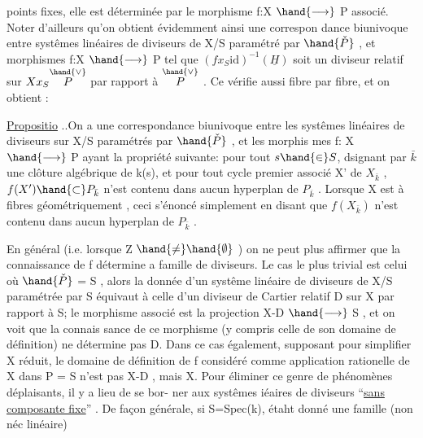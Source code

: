 
points fixes, elle est déterminée  par le morphisme f:X $\hand{\longrightarrow}$ P
associé. Noter d'ailleurs qu'on obtient évidemment ainsi une correspon
dance biunivoque entre systêmes linéaires de diviseurs de X/S paramétré
par $\hand{\check{P}}$ , et morphismes f:X $\hand{\longrightarrow}$ P tel que $(fx_S\mathrm{id})^{-1}(\underline{H})$ soit un
diviseur  relatif sur $Xx_S\overset{\hand{\vee}}{P}$ par rapport à $\overset{\hand{\vee}}{P}$ . Ce  
 vérifie aussi fibre par fibre, et on obtient :

\uline{Propositio} ..On a une correspondance biunivoque entre les 
systêmes linéaires  de diviseurs sur X/S paramétrés par $\hand{\check{P}}$ , et les morphis
mes f: X $\hand{\longrightarrow}$ P ayant la propriété suivante: pour tout $s\hand{\in} S$, dsignant
par $\bar{k}$ une clôture algébrique de k(s), et pour tout cycle premier associé
X' de $X_{\bar{k}}$ , $f(X')\hand{\subset} P_{\bar{k}}$ n'est contenu dans aucun hyperplan de $P_{\bar{k}}$ .
\hand{(}Lorsque X est à fibres géométriquement  , ceci 
 s'énoncé simplement en disant que $f(X_{\bar{k}})$ n'est contenu dans aucun
hyperplan de $P_{\bar{k}}$ \hand{)}.

En général (i.e.  lorsque Z $\hand{\neq}\hand{\emptyset}$ ) on ne peut plus affirmer que
la connaissance de f détermine a famille de diviseurs. Le cas le plus
trivial est celui où $\hand{\check{P}}$ = S , alors la donnée d'un systême linéaire de
diviseurs de X/S paramétrée par S équivaut à celle d'un diviseur de
Cartier relatif D sur X par rapport à S;  le morphisme
associé est la projection X-D $\hand{\longrightarrow}$ S , et on voit  que la connais
sance de ce morphisme (y compris celle de son domaine de définition)
ne détermine pas D. Dans ce cas également, supposant pour simplifier X
réduit, le domaine de définition de  f  considéré
comme application rationelle de X dans P = S n'est pas X-D , mais X.
Pour éliminer ce genre de phénomènes déplaisants, il y a lieu de se bor-%
ner aux systêmes iéaires de diviseurs ``\uline{sans composante fixe}'' . De
façon générale, si S=Spec(k), étaht donné une famille (non néc linéaire)


